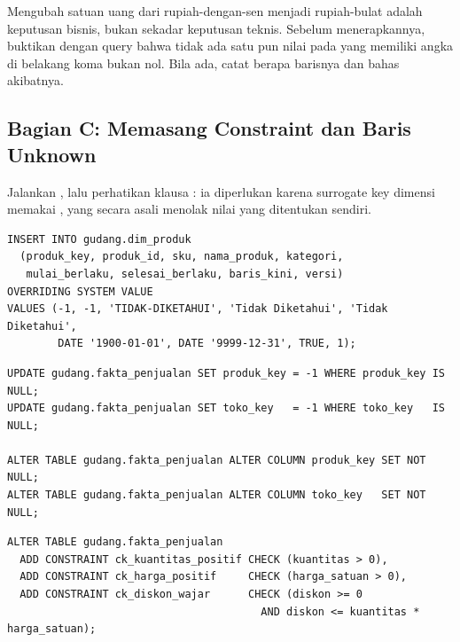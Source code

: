 \begin{peringatan}
Mengubah satuan uang dari rupiah-dengan-sen menjadi rupiah-bulat adalah
keputusan bisnis, bukan sekadar keputusan teknis. Sebelum menerapkannya,
buktikan dengan query bahwa tidak ada satu pun nilai pada
 yang memiliki angka di belakang koma bukan nol.
Bila ada, catat berapa barisnya dan bahas akibatnya.
\end{peringatan}

\subsection{Bagian C: Memasang Constraint dan Baris Unknown}


Jalankan , lalu perhatikan
klausa : ia diperlukan karena surrogate key
dimensi memakai , yang secara asali
menolak nilai yang ditentukan sendiri.

\begin{lstlisting}[style=sqlgaya]
INSERT INTO gudang.dim_produk
  (produk_key, produk_id, sku, nama_produk, kategori,
   mulai_berlaku, selesai_berlaku, baris_kini, versi)
OVERRIDING SYSTEM VALUE
VALUES (-1, -1, 'TIDAK-DIKETAHUI', 'Tidak Diketahui', 'Tidak Diketahui',
        DATE '1900-01-01', DATE '9999-12-31', TRUE, 1);
\end{lstlisting}


\begin{lstlisting}[style=sqlgaya]
UPDATE gudang.fakta_penjualan SET produk_key = -1 WHERE produk_key IS NULL;
UPDATE gudang.fakta_penjualan SET toko_key   = -1 WHERE toko_key   IS NULL;

ALTER TABLE gudang.fakta_penjualan ALTER COLUMN produk_key SET NOT NULL;
ALTER TABLE gudang.fakta_penjualan ALTER COLUMN toko_key   SET NOT NULL;
\end{lstlisting}


\begin{lstlisting}[style=sqlgaya]
ALTER TABLE gudang.fakta_penjualan
  ADD CONSTRAINT ck_kuantitas_positif CHECK (kuantitas > 0),
  ADD CONSTRAINT ck_harga_positif     CHECK (harga_satuan > 0),
  ADD CONSTRAINT ck_diskon_wajar      CHECK (diskon >= 0
                                        AND diskon <= kuantitas * harga_satuan);
\end{lstlisting}

